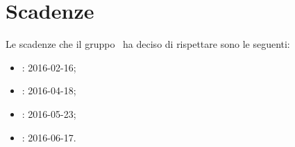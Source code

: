 \documentclass[../PianoProgetto.tex]{subfiles}
\begin{document}
\section{Scadenze}
		Le scadenze che il gruppo \leaf\ ha deciso di rispettare sono le seguenti:
		\begin{itemize}
		\item \revisionedeirequisiti : 2016-02-16;
		\item \revisionediprogettazione {}: 2016-04-18;
		\item \revisionediqualifica : 2016-05-23;
		\item \revisionediaccettazione : 2016-06-17.
		\end{itemize}
\end{document}
